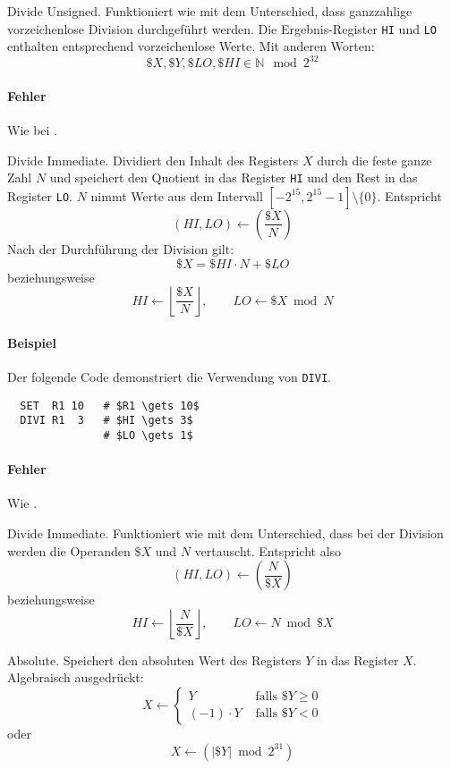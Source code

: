\glqq Divide Unsigned\grqq.
Funktioniert wie  mit dem Unterschied, dass ganzzahlige
vorzeichenlose Division durchgeführt werden. Die Ergebnis-Register \texttt{HI}
und \texttt{LO} enthalten entsprechend vorzeichenlose Werte. Mit anderen Worten:
\[
  \$X, \$Y, \$LO, \$HI \in \mathds{N} \mod 2^{32}
\]

\paragraph{Fehler}
Wie bei .




\glqq Divide Immediate\grqq.
Dividiert den Inhalt des Registers $X$ durch die feste ganze Zahl $N$ und
speichert den Quotient in das Register \texttt{HI} und den Rest in das Register
\texttt{LO}.
$N$ nimmt Werte aus dem Intervall $[-2^{15}, 2^{15}-1] \setminus \{0\}$.
Entspricht
\[
    (HI, LO) \gets \left( \frac{\$X}{N} \right)
\]
Nach der Durchführung der Division gilt:
\[
    \$X = \$HI \cdot N + \$LO 
\]
beziehungsweise
\[
  HI \gets \left\lfloor \frac{\$X}{N} \right\rfloor, \qquad
  LO \gets \$X \bmod N
\]


\paragraph{Beispiel}
Der folgende Code demonstriert die Verwendung von \texttt{DIVI}.
\begin{lstlisting}
  SET  R1 10   # $R1 \gets 10$
  DIVI R1  3   # $HI \gets 3$
               # $LO \gets 1$
\end{lstlisting}


\paragraph{Fehler}
Wie .


\glqq Divide Immediate\grqq.
Funktioniert wie  mit dem Unterschied, dass bei der Division werden
die Operanden $\$X$ und $N$ vertauscht. Entspricht also
\[
    (HI, LO) \gets \left( \frac{N}{\$X} \right)
\]
beziehungsweise
\[
  HI \gets \left\lfloor \frac{N}{\$X} \right\rfloor, \qquad
  LO \gets N \bmod \$X 
\]




\glqq Absolute\grqq.
Speichert den absoluten Wert des Registers $Y$ in das Register $X$.
Algebraisch ausgedrückt:
\[
    X \gets
    \begin{cases}
      Y            & \text{ falls } \$Y \geq 0 \\
      (-1) \cdot Y & \text{ falls } \$Y < 0
    \end{cases}
\]
oder
\[
    X \gets \left( \lvert \$Y \rvert \bmod 2^{31} \right) 
\]


